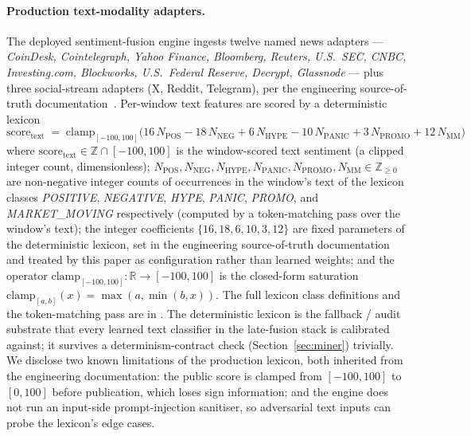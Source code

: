 \documentclass[11pt,a4paper]{article}
\begin{document}
\paragraph{Production text-modality adapters.} The deployed sentiment-fusion engine
ingests twelve named news adapters --- \emph{CoinDesk, Cointelegraph, Yahoo Finance,
Bloomberg, Reuters, U.S.\ SEC, CNBC, Investing.com, Blockworks, U.S.\ Federal
Reserve, Decrypt, Glassnode} --- plus three social-stream adapters (X, Reddit,
Telegram), per the engineering source-of-truth
documentation~\cite{omnirisk2026systemdesign}. Per-window text features are scored
by a deterministic lexicon
\begin{equation}
  \mathrm{score}_{\mathrm{text}}
  \;=\; \mathrm{clamp}_{[-100, 100]}\!\bigl(
    16\,N_{\mathrm{POS}}
    - 18\,N_{\mathrm{NEG}}
    + 6\,N_{\mathrm{HYPE}}
    - 10\,N_{\mathrm{PANIC}}
    + 3\,N_{\mathrm{PROMO}}
    + 12\,N_{\mathrm{MM}}
  \bigr)
  \label{eq:lexicon}
\end{equation}
where $\mathrm{score}_{\mathrm{text}} \in \mathbb{Z} \cap [-100, 100]$ is the
window-scored text sentiment (a clipped integer count, dimensionless);
$N_{\mathrm{POS}}, N_{\mathrm{NEG}}, N_{\mathrm{HYPE}}, N_{\mathrm{PANIC}},
N_{\mathrm{PROMO}}, N_{\mathrm{MM}} \in \mathbb{Z}_{\ge 0}$ are non-negative
integer counts of occurrences in the window's text of the lexicon classes
\emph{POSITIVE}, \emph{NEGATIVE}, \emph{HYPE}, \emph{PANIC}, \emph{PROMO}, and
\emph{MARKET\_MOVING} respectively (computed by a token-matching pass over the
window's text); the integer coefficients $\{16, 18, 6, 10, 3, 12\}$ are fixed
parameters of the deterministic lexicon, set in the engineering source-of-truth
documentation~\cite{omnirisk2026systemdesign} and treated by this paper as
configuration rather than learned weights; and the operator
$\mathrm{clamp}_{[-100, 100]}: \mathbb{R} \to [-100, 100]$ is the closed-form
saturation $\mathrm{clamp}_{[a, b]}(x) = \max(a, \min(b, x))$. The full lexicon
class definitions and the token-matching pass are in
\cite{omnirisk2026systemdesign}. The deterministic lexicon is the
fallback / audit substrate that every learned text classifier in the late-fusion
stack is calibrated against; it survives a determinism-contract check
(Section~\ref{sec:miner}) trivially. We disclose two known limitations of the
production lexicon, both inherited from the engineering documentation: the public
score is clamped from $[-100, 100]$ to $[0, 100]$ before publication, which loses
sign information; and the engine does not run an input-side prompt-injection
sanitiser, so adversarial text inputs can probe the lexicon's edge cases.
\end{document}
